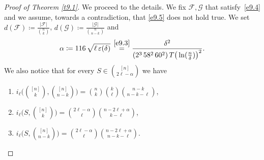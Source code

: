 \documentclass[10pt]{amsart}
\theoremstyle{remark}
\newcommand{\Fcal}{\mathcal{F}}
\newcommand{\Gcal}{\mathcal{G}}
\begin{document}
\begin{proof}[Proof of Theorem \emph{\ref{t9.1}}]
We proceed to the details. We fix $\Fcal,\Gcal$ that satisfy~\eqref{e9.4} and we assume, towards a contradiction,
that \eqref{e9.5} does not hold true. We set $d(\Fcal)\coloneqq \frac{|\Fcal|}{\binom{n}{k}}$,
$d(\Gcal)\coloneqq\frac{|\Gcal|}{\binom{n}{n-k}}$ and
\begin{equation} \label{e9.6}
\alpha\coloneqq 116\, \sqrt{\ell\,\varepsilon(\delta)}\, \stackrel{\eqref{e9.3}}{=}
\frac{\delta^2}{(2^3\,58^2\,60^2) \, T \big(\ln(\frac{n}{\delta})\big)^2}.
\end{equation}
We also notice that for every $S\in\binom{[n]}{2\ell-\alpha}$ we have
\begin{enumerate}
\item[$\bullet$] $i_{\ell}\big( \binom{[n]}{k},\binom{[n]}{n-k}\big)=\binom{n}{k}\binom{k}{\ell}\binom{n-k}{n-k-\ell}$,
\item[$\bullet$] $i_{\ell}\big(S,\binom{[n]}{k}\big)=\binom{2\ell-\alpha}{\ell}\binom{n-2\ell+\alpha}{k-\ell}$,
\item[$\bullet$] $i_{\ell}\big(S,\binom{[n]}{n-k}\big)=\binom{2\ell-\alpha}{\ell}\binom{n-2\ell+\alpha}{n-k-\ell}$.
\end{enumerate}


\end{proof}
\end{document}
